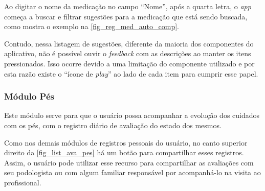 \begin{figure}[htb]
\begin{minipage}{0.46\textwidth}
    \end{minipage}
\end{figure}

Ao digitar o nome da medicação no campo “Nome”, após a quarta letra, o \emph{app} começa a buscar e filtrar
sugestões para a medicação que está sendo buscada, como mostra o exemplo na \autoref{fig_reg_med_auto_comp}.

Contudo, nessa listagem de sugestões, diferente da maioria dos componentes do aplicativo, não é possível ouvir o
\emph{feedback} com as descrições ao manter os itens pressionados. Isso ocorre devido a uma limitação do
componente utilizado e por esta razão existe o ``ícone de \emph{play}'' ao lado de cada item para cumprir
esse papel.

\subsubsection{Módulo Pés}

Este módulo serve para que o usuário possa acompanhar a evolução dos cuidados com os pés, com o registro
diário de avaliação do estado dos mesmos.

Como nos demais módulos de registros pessoais do usuário, no canto superior direito da \autoref{fig_list_ava_pes}
há um botão para compartilhar esses registros. Assim, o usuário pode utilizar esse recurso para compartilhar as
avaliações com seu podologista ou com algum familiar responsável por acompanhá-lo na visita ao profissional.

